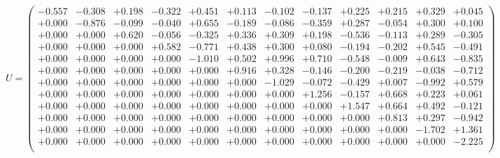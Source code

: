 \documentclass[9pt]{article}
\theoremstyle{plain}
\theoremstyle{definition}
\theoremstyle{remark}
\numberwithin{equation}{section}
\begin{document}
$U = \left(
\begin{array}{
cccccccccccc}
-0.557 & -0.308 & +0.198 & -0.322 & +0.451 & +0.113 & -0.102 & -0.137 & +0.225 & +0.215 & +0.329 & +0.045 \\
+0.000 & -0.876 & -0.099 & -0.040 & +0.655 & -0.189 & -0.086 & -0.359 & +0.287 & -0.054 & +0.300 & +0.100 \\
+0.000 & +0.000 & +0.620 & -0.056 & -0.325 & +0.336 & +0.309 & +0.198 & -0.536 & -0.113 & +0.289 & -0.305 \\
+0.000 & +0.000 & +0.000 & +0.582 & -0.771 & +0.438 & +0.300 & +0.080 & -0.194 & -0.202 & +0.545 & -0.491 \\
+0.000 & +0.000 & +0.000 & +0.000 & -1.010 & +0.502 & +0.996 & +0.710 & -0.548 & -0.009 & +0.643 & -0.835 \\
+0.000 & +0.000 & +0.000 & +0.000 & +0.000 & +0.916 & +0.328 & -0.146 & -0.200 & -0.219 & -0.038 & -0.712 \\
+0.000 & +0.000 & +0.000 & +0.000 & +0.000 & +0.000 & -1.029 & -0.072 & -0.429 & +0.007 & -0.992 & +0.579 \\
+0.000 & +0.000 & +0.000 & +0.000 & +0.000 & +0.000 & +0.000 & +1.256 & -0.157 & +0.668 & +0.223 & +0.061 \\
+0.000 & +0.000 & +0.000 & +0.000 & +0.000 & +0.000 & +0.000 & +0.000 & +1.547 & +0.664 & +0.492 & -0.121 \\
+0.000 & +0.000 & +0.000 & +0.000 & +0.000 & +0.000 & +0.000 & +0.000 & +0.000 & +0.813 & +0.297 & -0.942 \\
+0.000 & +0.000 & +0.000 & +0.000 & +0.000 & +0.000 & +0.000 & +0.000 & +0.000 & +0.000 & -1.702 & +1.361 \\
+0.000 & +0.000 & +0.000 & +0.000 & +0.000 & +0.000 & +0.000 & +0.000 & +0.000 & +0.000 & +0.000 & -2.225 \\
\end{array}
\right)$ \newline 
\end{document}
